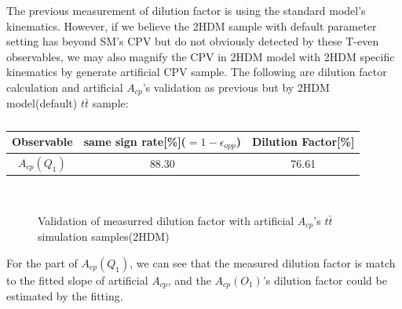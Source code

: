 			The previous measurement of dilution factor is using the standard model's kinematics. However, if we believe the 2HDM sample with default parameter setting has beyond SM's CPV but do not obviously detected by these T-even observables, we may also magnify the CPV in 2HDM model with 2HDM specific kinematics by generate artificial CPV sample. The following are dilution factor calculation and artificial $A_{cp}$'s validation as previous but by 2HDM model(default) $t\bar{t}$ sample:

			\begin{center}
			\setlength{\tabcolsep}{12pt}
			\begin{longtable}{ c | c c }
			\caption{}\\
			Observable & same sign rate[\%]($=1-\epsilon_{opp}$) & Dilution Factor[\%] \\
			\hline
			$A_{cp}(Q_1)$ & 88.30  &  76.61  \\
			\hline
			\end{longtable}
			\label{Obs:tb:2HDM_DF}
			\end{center}

			\begin{figure}[H]
			\centering
			    \\
			\caption{Validation of measurred dilution factor with artificial $A_{cp}$'s $t\bar{t}$ simulation samples(2HDM)}
			\label{Obs:fig:vali_2HDM}
			\end{figure}
			\FloatBarrier

			For the part of $A_{cp}(Q_1)$, we can see that the measured dilution factor is match to the fitted slope of artificial $A_{cp}$, and the $A_{cp}(O_1)$'s dilution factor could be estimated by the fitting.

\FloatBarrier
